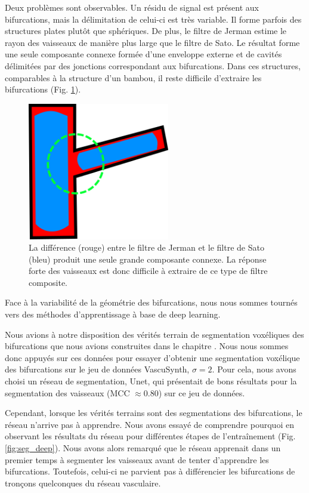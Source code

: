 Deux problèmes sont observables. Un résidu de signal est présent aux bifurcations, mais la délimitation de celui-ci est très variable. Il forme parfois des structures plates plutôt que sphériques. De plus, le filtre de Jerman estime le rayon des vaisseaux de manière plus large que le filtre de Sato. Le résultat forme une seule composante connexe formée d'une enveloppe externe et de cavités délimitées par des jonctions correspondant aux bifurcations. Dans ces structures, comparables à la structure d'un bambou, il reste difficile d'extraire les bifurcations (Fig. \ref{fig:combo_vesselness}).

\begin{figure}[!ht]
    \centering
    \includegraphics[height=6cm]{Images/combo_vesselness_2D.png}
    \caption{La différence (rouge) entre le filtre de Jerman et le filtre de Sato (bleu) produit une seule grande composante connexe. La réponse forte des vaisseaux est donc difficile à extraire de ce type de filtre composite.}
    \label{fig:combo_vesselness}
\end{figure}


Face à la variabilité de la géométrie des bifurcations, nous nous sommes tournés vers des méthodes d'apprentissage à base de deep learning.

Nous avions à notre disposition des vérités terrain de segmentation voxéliques des bifurcations que nous avions construites dans le chapitre \chapBenchN{}. Nous nous sommes donc appuyés sur ces données pour essayer d'obtenir une segmentation voxélique des bifurcations sur le jeu de données VascuSynth, $\sigma=2$. Pour cela, nous avons choisi un réseau de segmentation, Unet, qui présentait de bons résultats pour la segmentation des vaisseaux (MCC $\approx 0.80$) sur ce jeu de données.

Cependant, lorsque les vérités terrains sont des segmentations des bifurcations, le réseau n'arrive pas à apprendre. Nous avons essayé de comprendre pourquoi en observant les résultats du réseau pour différentes étapes de l'entraînement (Fig. \ref{fig:seg_deep}). Nous avons alors remarqué que le réseau apprenait dans un premier temps à segmenter les vaisseaux avant de tenter d'apprendre les bifurcations. Toutefois, celui-ci ne parvient pas à différencier les bifurcations de tronçons quelconques du réseau vasculaire.

